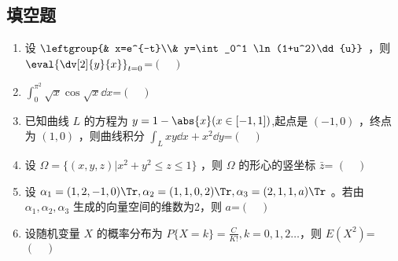 \subsection{填空题}
\begin{enumerate}
\item 设 $\leftgroup{& x=e^{-t}\\& y=\int_0^1 \ln(1+u^2)\dd{u}}$   ，则 $\displaystyle \eval{\dv[2]{y}{x}}_{t=0}$=$(\quad )$
\item $\int_0^{\pi^2}\sqrt{x}\cos \sqrt{x}\dd{x}$=$(\quad )$
\item  已知曲线 $L$ 的方程为 $y=1-\abs{x} (x \in [-1,1])$,起点是 $(-1,0)$ ，终点为 $(1,0)$ ，则曲线积分 $\displaystyle \int_L xy\dd{x}+x^2\dd{y}$=$(\quad )$
\item 设 $\Omega=\{(x,y,z)|x^2+y^2\le z \le1\}$ ，则 $\Omega$ 的形心的竖坐标 $\bar z$= $(\quad )$
\item 设 $\alpha_1=(1,2,-1,0)\Tr ,\alpha_2=(1,1,0,2)\Tr ,\alpha_3=(2,1,1,a)\Tr $  。若由 $\alpha_1,\alpha_2,\alpha_3$  生成的向量空间的维数为2，则  $a$=$(\quad )$
\item  设随机变量 $X$  的概率分布为 $P\{X=k\}=\frac{C}{K!},k=0,1,2\dots$，则 $E(X^2)$=$(\quad )$
\end{enumerate}
